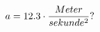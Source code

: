 \documentclass[preview]{standalone}
\begin{document}
\begin{align*}
\special{dvisvgm:raw <g id='unique000'>}a = 12.3 \cdot \frac{Meter}{sekunde^{2}} ?\special{dvisvgm:raw </g>}
\end{align*}
\end{document}
